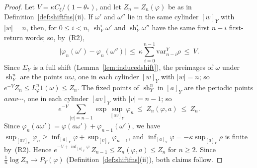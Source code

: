 \documentclass[11pt]{amsart}
\theoremstyle{definition}
\theoremstyle{remark}
\newcommand{\abs}[1]{\lvert #1\rvert}
\begin{document}
\begin{proof}
Let $V=\kappa C_\xi/(1-\theta_*)$, and let $Z_n=Z_n(\varphi)$ be as in Definition~\ref{def:shiftfns}(ii). If $\omega'$ and $\omega''$ lie in the same cylinder $[w]_Y$ with $\abs w=n$, then, for $0\le i<n$, $\operatorname{sh}_Y^i\omega'$ and $\operatorname{sh}_Y^i\omega''$ have the same first $n-i$ first-return words; so, by~(R2),
\[
  \abs{\varphi_n(\omega')-\varphi_n(\omega'')}\ \le\ \kappa\sum_{i=0}^{n-1}\mathrm{var}^Y_{n-i}\rho\ \le\ V .
\]
Since $\Sigma_Y$ is a full shift (Lemma~\ref{lem:inducedshift}), the preimages of $\omega$ under $\operatorname{sh}_Y^n$ are the points $w\omega$, one in each cylinder $[w]_Y$ with $\abs w=n$; so $e^{-V}Z_n\le L^n_\varphi1(\omega)\le Z_n$. The fixed points of $\operatorname{sh}_Y^n$ in $[a]_Y$ are the periodic points $avav\cdots$, one in each cylinder $[av]_Y$ with $\abs v=n-1$; so
\[
  e^{-V}\sum_{\abs v=n-1}\exp\sup_{[av]_Y}\varphi_n\ \le\ Z_n(\varphi,a)\ \le\ Z_n .
\]
Since $\varphi_n(a\omega')=\varphi(a\omega')+\varphi_{n-1}(\omega')$, we have $\sup_{[av]_Y}\varphi_n\ge\inf_{[a]_Y}\varphi+\sup_{[v]_Y}\varphi_{n-1}$, and $\inf_{[a]_Y}\varphi=-\kappa\sup_{[a]_Y}\rho$ is finite by~(R2). Hence $e^{-V+\inf_{[a]_Y}\varphi}\,Z_{n-1}\le Z_n(\varphi,a)\le Z_n$ for $n\ge2$. Since $\frac1n\log Z_n\to P_Y(\varphi)$ (Definition~\ref{def:shiftfns}(ii)), both claims follow.
\end{proof}
\end{document}
